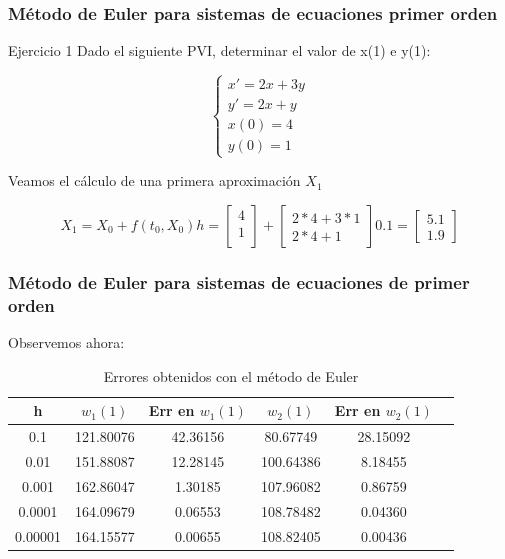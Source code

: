 \documentclass{beamer}
\begin{document}
\begin{frame}
	\frametitle{Método de Euler para sistemas de ecuaciones primer orden}
	\begin{block}{Ejercicio 1}
		Dado el siguiente PVI, determinar el valor de x(1) e y(1):
		
		$$
		\begin{cases}
		x' = 2x + 3y\\
		y' = 2x + y \\
		x(0) = 4\\
		y(0)=1
		\end{cases}
		$$
	\end{block}
	
	Veamos el cálculo de una primera aproximación $X_1$
	
	\begin{equation*}
	X_1=X_0+f(t_0,X_0)h=\begin{bmatrix}
	4\\
	1\\
	\end{bmatrix} + \begin{bmatrix}
	2*4 +3*1\\
	2*4 + 1
	\end{bmatrix}0.1=\begin{bmatrix}
	5.1\\
	1.9
	\end{bmatrix}  
	\end{equation*}
	
\end{frame}

\begin{frame}
	\frametitle{Método de Euler para sistemas de ecuaciones de primer orden}
	
	Observemos ahora:
	
	\begin{table}[H]
		\centering
		\setlength\extrarowheight{2.5pt}
		
		\begin{tabular}{|c|c|c|c|c|c}
			\hline
			\textbf{h} & {\textbf{$w_1(1)$}} & \textbf{Err en $w_1(1)$} & {\textbf{$w_2(1)$}} & \textbf{Err en $w_2(1)$} \\ 
			\hline
			0.1 & 121.80076 & 42.36156 & 80.67749 & 28.15092\\
			\hline
			0.01 & 151.88087 & 12.28145 & 100.64386 & 8.18455\\
			\hline
			0.001 & 162.86047 & 1.30185 & 107.96082 & 0.86759\\
			\hline
			0.0001 & 164.09679 & 0.06553 & 108.78482 & 0.04360\\
			\hline
			0.00001 & 164.15577 & 0.00655 & 108.82405 & 0.00436\\
			\hline   
		\end{tabular}
		
		\caption{Errores obtenidos con el método de Euler}           
	\end{table}
	
\end{frame}
\end{document}
